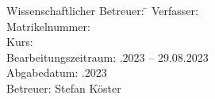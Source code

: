 \begin{titlepage}
\begin{center}
\begin{minipage}{\textwidth}
    \begin{tabbing}
        Wissenschaftlicher Betreuer: \hspace{0.85cm}\=\kill
        Verfasser: \> \DerAutorDerArbeit \\[1.5mm]
        Matrikelnummer:  \\[1.5mm]
        Kurs: \> \DieKursbezeichnung \\[1.5mm]
        Bearbeitungszeitraum: .2023 -- 29.08.2023\\ [1.5mm]
        Abgabedatum: .2023\\ [1.5mm]
        Betreuer: \> Stefan Köster\\
    \end{tabbing}
    
    \end{minipage}
    
    \end{center}
    
    \end{titlepage}